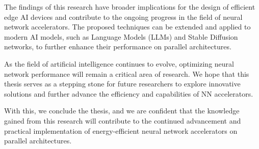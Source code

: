 The findings of this research have broader implications for the design of efficient edge AI devices and contribute to the ongoing progress in the field of neural network accelerators. The proposed techniques can be extended and applied to modern AI models, such as Language Models (LLMs) and Stable Diffusion networks, to further enhance their performance on parallel architectures.

As the field of artificial intelligence continues to evolve, optimizing neural network performance will remain a critical area of research. We hope that this thesis serves as a stepping stone for future researchers to explore innovative solutions and further advance the efficiency and capabilities of NN accelerators.

With this, we conclude the thesis, and we are confident that the knowledge gained from this research will contribute to the continued advancement and practical implementation of energy-efficient neural network accelerators on parallel architectures.